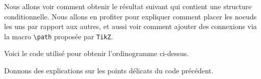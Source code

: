 \documentclass[12pt,a4paper]{article}
\begin{document}
Nous allons voir comment obtenir le résultat suivant qui contient une structure conditionnelle. Nous allons en profiter pour expliquer comment placer les noeuds les uns par rapport aux autres, et aussi voir comment ajouter des connexions via la macro \verb+\path+ proposée par \verb#TikZ#.


\begin{center}
    \small
    
\end{center}


Voici le code utilisé pour obtenir l'ordinogramme ci-dessus.

\medskip



Donnons des explications sur les points délicats du code précédent.
\end{document}
